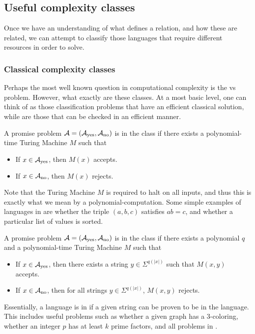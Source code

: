 \documentclass[../thesis-main/thesis-main]{subfiles}
\begin{document}
\subsection{Useful complexity classes}

Once we have an understanding of what defines a relation, and how these are related, we can attempt to classify those languages that require different resources in order to solve.

\subsubsection{Classical complexity classes}

  Perhaps the most well known question in computational complexity is the \PP{} vs \NP{} problem.  However, what exactly are these classes.  At a most basic level, one can think of \PP{} as those classification problems that have an efficient classical solution, while \NP{} are those that can be checked in an efficient manner.  


\begin{definition}[\PP]
  A promise problem $\mathcal{A}= (\mathcal{A}_{\text{yes}},\mathcal{A}_{\text{no}})$ is in the class \PP{} if there exists a polynomial-time Turing Machine $M$ such that 
 \begin{itemize}
   \item If $x\in \mathcal{A}_{\text{yes}}$, then $M(x)$ accepts.
   \item If $x\in \mathcal{A}_{\text{no}}$, then $M(x)$ rejects.
 \end{itemize}
\end{definition}

Note that the Turing Machine $M$ is required to halt on all inputs, and thus this is exactly what we mean by a polynomial-computation.  Some simple examples of languages in \PP{} are whether the triple $(a,b,c)$ satisfies $ab = c$, and whether a particular list of values is sorted.


\begin{definition}[\NP]
  A promise problem $\mathcal{A}=(\mathcal{A}_{\text{yes}},\mathcal{A}_{\text{no}})$ is in the class \NP if there exists a polynomial $q$ and a polynomial-time Turing Machine $M$ such that
  \begin{itemize}
    \item If $x\in \mathcal{A}_{\text{yes}}$, then there exists a string $y\in \Sigma^{q(|x|)}$ such that $M(x,y)$ accepts.
    \item If $x\in \mathcal{A}_{\text{no}}$, then for all strings $y\in \Sigma^{q(|x|)}$, $M(x,y)$ rejects.
  \end{itemize}
\end{definition}
Essentially, a language is in \NP{} if a given string can be proven to be in the language.  This includes useful problems such as whether a given graph has a 3-coloring, whether an integer $p$ has at least $k$ prime factors, and all problems in \PP.
\end{document}
